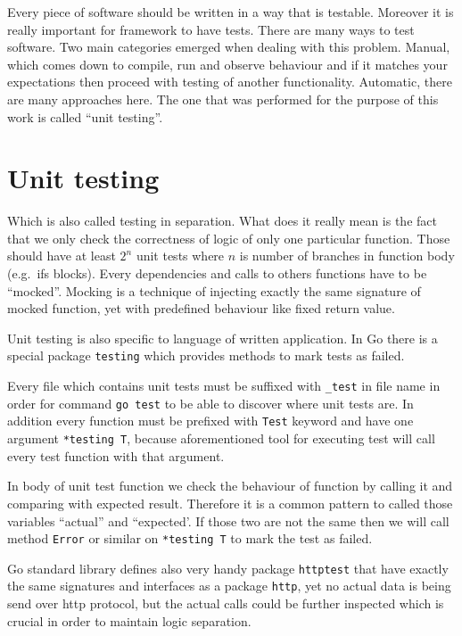 Every piece of software should be written in a way that is testable. Moreover it is really important for framework to have tests. There are many ways to test software. Two main categories emerged when dealing with this problem. Manual, which comes down to compile, run and observe behaviour and if it matches your expectations then proceed with testing of another functionality. Automatic, there are many approaches here. The one that was performed for the purpose of this work is called ``unit testing''.

\section{Unit testing}
Which is also called testing in separation. What does it really mean is the fact that we only check the correctness of logic of only one particular function. Those should have at least $2^n$ unit tests where $n$ is number of branches in function body (e.g.\ ifs blocks). Every dependencies and calls to others functions have to be ``mocked''. Mocking is a technique of injecting exactly the same signature of mocked function, yet with predefined behaviour like fixed return value.

Unit testing is also specific to language of written application. In Go there is a special package \verb|testing| which provides methods to mark tests as failed.

Every file which contains unit tests must be suffixed with \verb|_test| in file name\cite{Testing-go} in order for command \verb|go test| to be able to discover where unit tests are. In addition every function must be prefixed with \verb|Test| keyword and have one argument \verb|*testing T|, because aforementioned tool for executing test will call every test function with that argument.

In body of unit test function we check the behaviour of function by calling it and comparing with expected result. Therefore it is a common pattern to called those variables ``actual'' and ``expected'. If those two are not the same then we will call method \verb|Error| or similar on \verb|*testing T| to mark the test as failed.

Go standard library defines also very handy package \verb|httptest|\cite{httptest-go} that have exactly the same signatures and interfaces as a package \verb|http|, yet no actual data is being send over http protocol, but the actual calls could be further inspected which is crucial in order to maintain logic separation.


